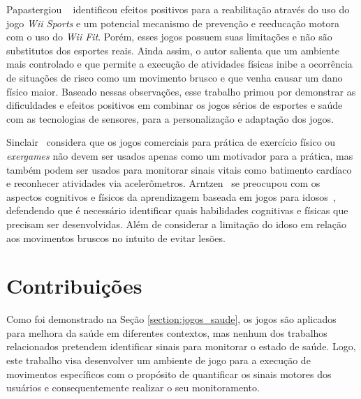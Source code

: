 
Papastergiou ~\cite{Papastergiou:2009:EPC:1570538.1570707} identificou efeitos positivos para a reabilitação através do uso do jogo \textit{Wii Sports} e um potencial mecanismo de prevenção e reeducação motora com o uso do \textit{Wii Fit}. Porém, esses jogos possuem suas limitações e não são substitutos dos esportes reais. Ainda assim, o autor salienta que um ambiente mais controlado e que permite a execução de atividades físicas inibe a ocorrência de situações de risco como um movimento brusco e que venha causar um dano físico maior. Baseado nessas observações, esse trabalho primou por demonstrar as dificuldades e efeitos positivos em combinar os jogos sérios de esportes e saúde com as tecnologias de sensores, para a personalização e adaptação dos jogos.

Sinclair~\cite{Sinclair:2009:UVB:1515604.1515617} considera que os jogos comerciais para prática de exercício físico ou \textit{exergames} não devem ser usados apenas como um motivador para a prática, mas também podem ser usados para monitorar sinais vitais como batimento cardíaco e reconhecer atividades via acelerômetros. Arntzen~\cite{arntzen2011} se preocupou com os aspectos cognitivos e físicos da aprendizagem baseada em jogos para idosos~\cite{arntzen2011}, defendendo que é necessário identificar quais habilidades cognitivas e físicas que precisam ser desenvolvidas. Além de considerar a limitação do idoso em relação aos movimentos bruscos no intuito de evitar lesões.




\section{Contribuições}
Como foi demonstrado na Seção \ref{section:jogos_saude}, os jogos são aplicados para melhora da saúde em diferentes contextos, mas nenhum dos trabalhos relacionados pretendem identificar sinais para monitorar o estado de saúde. Logo, este trabalho visa desenvolver um ambiente de jogo para a execução de movimentos específicos com o propósito de quantificar os sinais motores dos usuários e consequentemente realizar o seu monitoramento.

